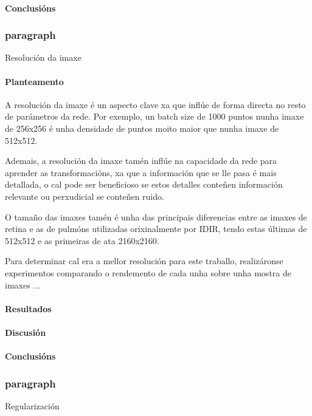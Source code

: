 \paragraph{Conclusións}
\label{par:Conclusións}

\subsubsection{paragraph}{Resolución da imaxe}
\label{subsubsec:Resolución da imaxe}

\paragraph{Planteamento}
\label{par:Planteamento}

A resolución da imaxe é un aspecto clave xa que inflúe de forma directa no resto de parámetros da rede.
Por exemplo, un batch size de 1000 puntos nunha imaxe de 256x256 é unha densidade de puntos moito maior que nunha imaxe de 512x512.

Ademais, a resolución da imaxe tamén inflúe na capacidade da rede para aprender as transformacións, xa que a información que se lle pasa é mais detallada, 
o cal pode ser beneficioso se estos detalles conteñen información relevante ou perxudicial se conteñen ruido.

O tamaño das imaxes tamén é unha das principais diferencias entre as imaxes de retina e as de pulmóns utilizadas orixinalmente por IDIR, tendo estas últimas de 512x512 e as primeiras de ata 2160x2160.

Para determinar cal era a mellor resolución para este traballo, realizáronse experimentos comparando o rendemento de cada unha sobre unha mostra de imaxes ...

\paragraph{Resultados}
\label{par:Resultados}

\paragraph{Discusión}
\label{par:Discusión}

\paragraph{Conclusións}
\label{par:Conclusións}


\subsubsection{paragraph}{Regularización}
\label{subsubsec:Regularización}

